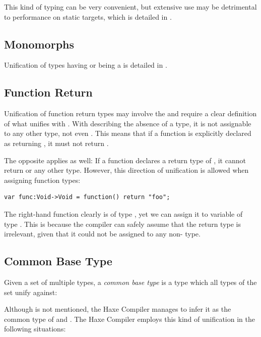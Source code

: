\documentclass{haxe}
\begin{document}
This kind of typing can be very convenient, but extensive use may be detrimental to performance on static targets, which is detailed in .


\subsection{Monomorphs}
\label{type-system-monomorphs}

Unification of types having or being a  is detailed in .


\subsection{Function Return}
\label{type-system-unification-function-return}

Unification of function return types may involve the  and require a clear definition of what unifies with . With  describing the absence of a type, it is not assignable to any other type, not even . This means that if a function is explicitly declared as returning , it must not return .

The opposite applies as well: If a function declares a return type of , it cannot return  or any other type. However, this direction of unification is allowed when assigning function types:

\begin{lstlisting}
var func:Void->Void = function() return "foo";
\end{lstlisting}
The right-hand function clearly is of type , yet we can assign it to variable  of type . This is because the compiler can safely assume that the return type is irrelevant, given that it could not be assigned to any non- type.


\subsection{Common Base Type}
\label{type-system-unification-common-base-type}

Given a set of multiple types, a \emph{common base type} is a type which all types of the set unify against:

Although  is not mentioned, the Haxe Compiler manages to infer it as the common type of  and . The Haxe Compiler employs this kind of unification in the following situations:
\end{document}
